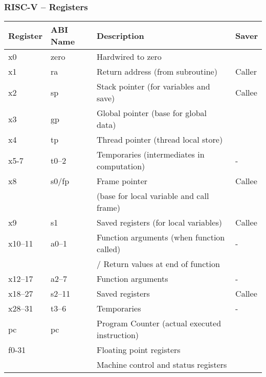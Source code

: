 \documentclass{beamer}
\begin{document}
\begin{frame}[shrink=12]
\frametitle{RISC-V -- Registers}
\begin{tabular}{|l|l|l|l|}\hline
Register & ABI Name & Description & Saver \\ \hline
x0 & zero & Hardwired to zero &  \\\hline
x1 & ra & Return address (from subroutine) & Caller \\\hline
x2 & sp & Stack pointer (for variables and save) &  Callee \\\hline
x3 & gp & Global pointer (base for global data) &  \\\hline
x4 & tp & Thread pointer (thread local store) &  \\\hline
x5-7 & t0--2 & Temporaries (intermediates in computation) &  - \\\hline
x8 & s0/fp & Frame pointer  & Callee \\
   &       & (base for local variable and call frame) &  \\\hline
x9 & s1 & Saved registers (for local variables) &  Callee \\\hline
x10--11 & a0--1 & Function arguments (when function called) &  - \\
 &  & / Return values at end of function  & \\\hline
x12--17 & a2--7 & Function arguments & - \\\hline
x18--27 & s2--11 & Saved registers & Callee \\\hline
x28--31 & t3--6 & Temporaries &  - \\\hline
pc & pc & Program Counter (actual executed instruction) &  \\\hline
f0-31 &  & Floating point registers &  \\\hline
     &  & Machine control and status registers & \\\hline
\end{tabular}
\end{frame}
\end{document}
